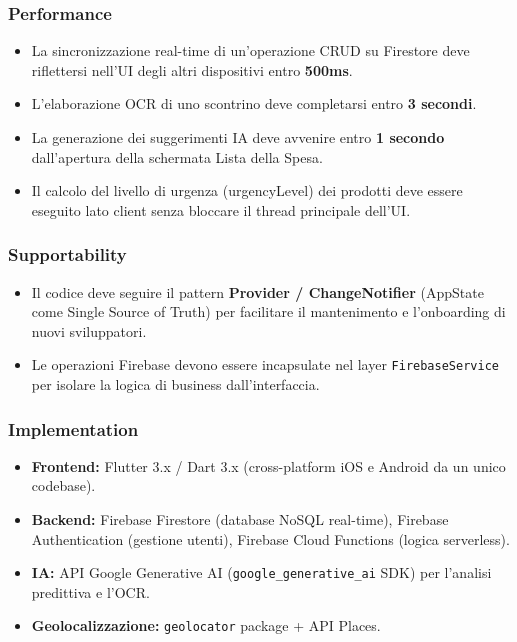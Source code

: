 \documentclass[12pt,a4paper]{article}
\begin{document}
\subsubsection{Performance}
\begin{itemize}
    \item La sincronizzazione real-time di un'operazione CRUD su Firestore deve riflettersi nell'UI degli altri dispositivi entro \textbf{500ms}.
    \item L'elaborazione OCR di uno scontrino deve completarsi entro \textbf{3 secondi}.
    \item La generazione dei suggerimenti IA deve avvenire entro \textbf{1 secondo} dall'apertura della schermata Lista della Spesa.
    \item Il calcolo del livello di urgenza (urgencyLevel) dei prodotti deve essere eseguito lato client senza bloccare il thread principale dell'UI.
\end{itemize}

\subsubsection{Supportability}
\begin{itemize}
    \item Il codice deve seguire il pattern \textbf{Provider / ChangeNotifier} (AppState come Single Source of Truth) per facilitare il mantenimento e l'onboarding di nuovi sviluppatori.
    \item Le operazioni Firebase devono essere incapsulate nel layer \texttt{FirebaseService} per isolare la logica di business dall'interfaccia.
\end{itemize}

\subsubsection{Implementation}
\begin{itemize}
    \item \textbf{Frontend:} Flutter 3.x / Dart 3.x (cross-platform iOS e Android da un unico codebase).
    \item \textbf{Backend:} Firebase Firestore (database NoSQL real-time), Firebase Authentication (gestione utenti), Firebase Cloud Functions (logica serverless).
    \item \textbf{IA:} API Google Generative AI (\texttt{google\_generative\_ai} SDK) per l'analisi predittiva e l'OCR.
    \item \textbf{Geolocalizzazione:} \texttt{geolocator} package + API Places.
\end{itemize}
\end{document}
